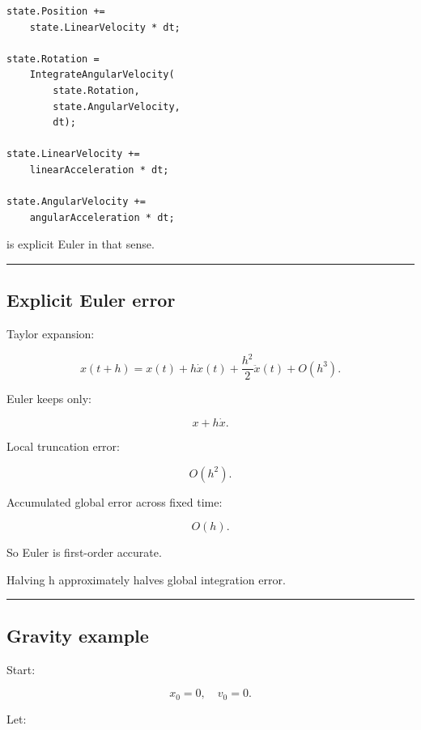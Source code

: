 \begin{verbatim}
state.Position +=
    state.LinearVelocity * dt;

state.Rotation =
    IntegrateAngularVelocity(
        state.Rotation,
        state.AngularVelocity,
        dt);

state.LinearVelocity +=
    linearAcceleration * dt;

state.AngularVelocity +=
    angularAcceleration * dt;
\end{verbatim}

is explicit Euler in that sense.

\begin{center}\rule{0.5\linewidth}{0.5pt}\end{center}

\subsection{Explicit Euler error}\label{06-engine-ii-ch037-explicit-euler-error}

\hypertarget{06-engine-ii-ch037-explicit-euler-error}{}

Taylor expansion:

\[
x(t+h)
=
x(t)
+
h\dot x(t)
+
\frac{h^2}{2}\ddot x(t)
+
O(h^3).
\]

Euler keeps only:

\[
x+h\dot x.
\]

Local truncation error:

\[
O(h^2).
\]

Accumulated global error across fixed time:

\[
\boxed{
O(h).
}
\]

So Euler is first-order accurate.

Halving h approximately halves global integration error.

\begin{center}\rule{0.5\linewidth}{0.5pt}\end{center}

\subsection{Gravity example}\label{06-engine-ii-ch037-gravity-example}

\hypertarget{06-engine-ii-ch037-gravity-example}{}

Start:

\[
x_0=0,\quad v_0=0.
\]

Let:

